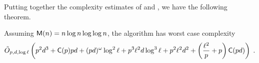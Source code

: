 Putting together the complexity estimates of \ctwoas{} and \ctwoasfi{}, we
have the following theorem.

\begin{theorem}
  \label{th:complexity}
  Assuming $\mathsf{M}(n) = n\log n\log\log n$, the algorithm \ctwoasfi{} has
  worst case complexity
  \begin{equation*}
    \tilde{O}_{p,d,\log\ell}\left(
      p^2d^3 +
      \mathsf{C}(p)pd +
      (pd)^\omega\log^2\ell +
      p^3\ell^2 d\log^3\ell + 
      p^2\ell^2 d^2+
      \left(\frac{\ell^2}{p} + p\right)\mathsf{C}(pd)
    \right)
    \;\text{.}
  \end{equation*}
\end{theorem}



%

